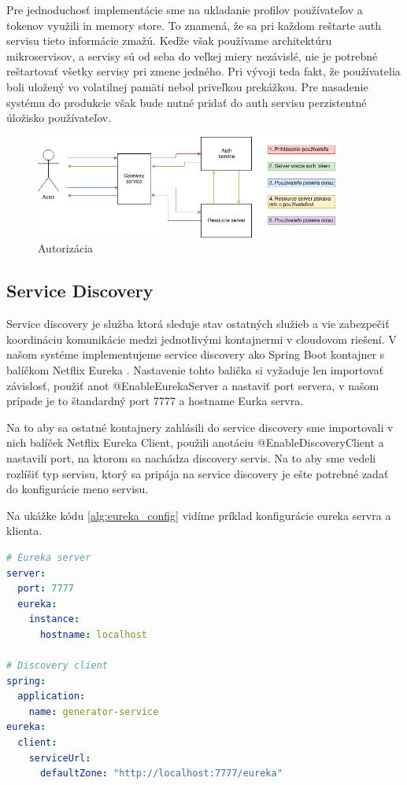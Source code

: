 Pre jednoduchosť implementácie sme na ukladanie profilov používateľov a tokenov využili in memory store. To znamená, že sa pri každom reštarte auth servisu tieto informácie zmažú. Keďže však používame architektúru mikroservisov, a servisy sú od seba do veľkej miery nezávislé, nie je potrebné reštartovať všetky servisy pri zmene jedného. Pri vývoji teda fakt, že používatelia boli uložený vo volatilnej pamäti nebol priveľkou prekážkou. Pre nasadenie systému do produkcie však bude nutné pridať do auth servisu perzistentné úložisko používateľov.   


\begin{figure}[!htbp] 
	\centering 
	\includegraphics[width=10cm]{img/auth_operation.png} 
	\caption{Autorizácia} 
	\label{auth_operation} 
\end{figure}  

\subsection{Service Discovery}
Service discovery je služba ktorá sleduje stav ostatných služieb a vie zabezpečiť koordináciu komunikácie medzi jednotlivými kontajnermi v cloudovom riešení. V našom systéme implementujeme service discovery ako Spring Boot kontajner s balíčkom Netflix Eureka \cite{eureka}. Nastavenie tohto balička si vyžaduje len importovať závislosť, použiť anot @EnableEurekaServer a nastaviť port servera, v našom prípade je to štandardný port 7777 a hostname Eurka servra. 

Na to aby sa ostatné kontajnery zahlásili do service discovery sme importovali v nich balíček Netflix Eureka Client, použili anotáciu @EnableDiscoveryClient a nastavili port, na ktorom sa nachádza discovery servis. Na to aby sme vedeli rozlíšiť typ servisu, ktorý sa pripája na service discovery je ešte potrebné zadať do konfigurácie meno servisu.  

Na ukážke kódu \ref{alg:eureka_config} vidíme príklad konfigurácie eureka servra a klienta. 


\begin{lstlisting}[float, caption={Konfigurácia Eureka servra a klienta},label={alg:eureka_config},language=yaml]
# Eureka server
server:
  port: 7777
  eureka:
	instance:
	  hostname: localhost
			
# Discovery client	
spring:
  application:
	name: generator-service
eureka:
  client:
	serviceUrl:
	  defaultZone: "http://localhost:7777/eureka"
\end{lstlisting} 


